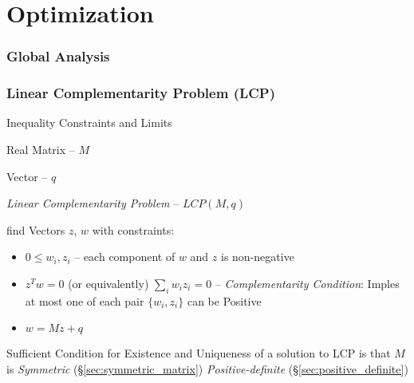 \part{Optimization}\label{part:optimization}

\section{Global Analysis}\label{sec:global_analysis}

\section{Linear Complementarity Problem (LCP)}
\label{sec:linear_complementary}

Inequality Constraints and Limits %

Real Matrix -- $M$

Vector -- $q$

\emph{Linear Complementarity Problem} -- $LCP(M,q)$

find Vectors $z$, $w$ with constraints:

\begin{itemize}
  \item $0 \leq w_i,z_i$ -- each component of $w$ and $z$ is
    non-negative
  \item $z^T w = 0$ (or equivalently) $\sum_i w_i z_i = 0$ --
    \emph{Complementarity Condition}: Imples at most one of each pair
    $\{w_i,z_i\}$ can be Positive
  \item $w = M z + q$
\end{itemize}

Sufficient Condition for Existence and Uniqueness of a solution to LCP
is that $M$ is \emph{Symmetric} (\S\ref{sec:symmetric_matrix})
\emph{Positive-definite} (\S\ref{sec:positive_definite})



